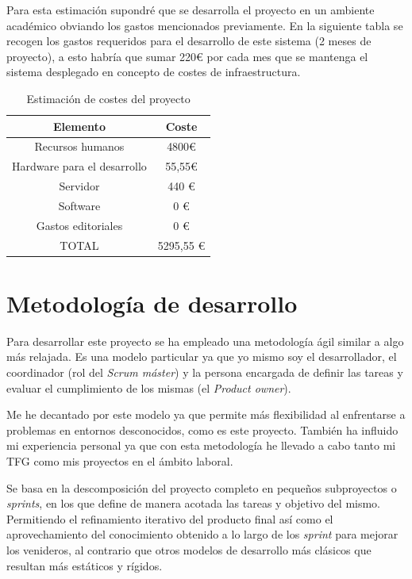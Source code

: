 Para esta estimación supondré que se desarrolla el proyecto en un ambiente académico obviando los gastos mencionados previamente. En la siguiente tabla se recogen los gastos requeridos para el desarrollo de este sistema (2 meses de proyecto), a esto habría que sumar 220€ por cada mes que se mantenga el sistema desplegado en concepto de costes de infraestructura.

\begin{table} [h!]
	\centering
	\begin{tabular}{| c | c |}
		\hline
		\textbf{Elemento}      & \textbf{Coste} \\ \hline
		Recursos humanos       & 4800€          \\
		Hardware para el desarrollo & 55,55€         \\
		Servidor           & 440 €          \\
		Software           & 0 €            \\
		Gastos editoriales      & 0 €            \\ \hline
		TOTAL & 5295,55 € \\ \hline
	\end{tabular}
	\caption{Estimación de costes del proyecto}
\end{table}


\section{Metodología de desarrollo}
\label{sc:metodologia}
Para desarrollar este proyecto se ha empleado una metodología ágil similar a \textit{}  algo más relajada. Es una modelo particular ya que yo mismo soy el desarrollador, el coordinador (rol del \textit{Scrum máster}) y la persona encargada de definir las tareas y evaluar el cumplimiento de los mismas (el \textit{Product owner}).

Me he decantado por este modelo ya que permite más flexibilidad al enfrentarse a problemas en entornos desconocidos, como es este proyecto. También ha influido mi experiencia personal ya que con esta metodología he llevado a cabo tanto mi \acrshort{TFG} como mis proyectos en el ámbito laboral. 

Se basa en la descomposición del proyecto completo en pequeños subproyectos o \textit{sprints}, en los que define de manera acotada las tareas y objetivo del mismo. Permitiendo el refinamiento iterativo del producto final así como el aprovechamiento del conocimiento obtenido a lo largo de los \textit{sprint} para mejorar los venideros, al contrario que otros modelos de desarrollo más clásicos que resultan más estáticos y rígidos.

